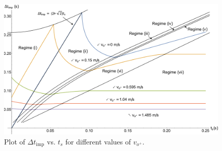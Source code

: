 \documentclass[letterpaper, 10 pt, conference]{ieeeconf}  %
\begin{document}
\begin{figure}
	\includegraphics[width=\linewidth]{deltVsts_differentVop.pdf}
	\caption[Variation of time between impacts with switching time for partially closed-loop control]{Plot of $\Delta t_{\textrm{imp}}$ vs. $t_s$ for different values of $v_{o^+}$.}
	\label{delTvsTs}
	\vspace{-0.5em}
\end{figure}
\end{document}
